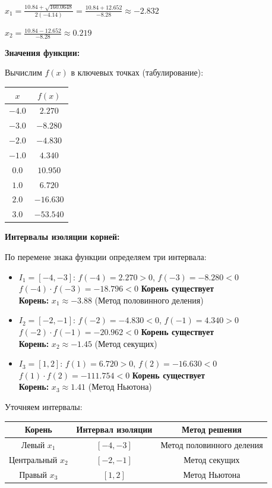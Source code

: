 \documentclass[a4paper,12pt]{article}
\begin{document}
$x_1 = \frac{10.84 + \sqrt{160.0648}}{2(-4.14)} = \frac{10.84 + 12.652}{-8.28} \approx -2.832$

$x_2 = \frac{10.84 - 12.652}{-8.28} \approx 0.219$

\textbf{Значения функции:}

Вычислим $f(x)$ в ключевых точках (табулирование):

\begin{center}
\begin{tabular}{|c|c|}
\hline
$x$ & $f(x)$ \\
\hline
$-4.0$ & $2.270$ \\
$-3.0$ & $-8.280$ \\
$-2.0$ & $-4.830$ \\
$-1.0$ & $4.340$ \\
$0.0$ & $10.950$ \\
$1.0$ & $6.720$ \\
$2.0$ & $-16.630$ \\
$3.0$ & $-53.540$ \\
\hline
\end{tabular}
\end{center}

\textbf{Интервалы изоляции корней:}

По перемене знака функции определяем три интервала:
\begin{itemize}
    \item $I_1 = [-4, -3]$: $f(-4) = 2.270 > 0$, $f(-3) = -8.280 < 0$ \\
    $f(-4) \cdot f(-3) = -18.796 < 0$ \quad \textbf{Корень существует} \\
    \textbf{Корень: } $x_1 \approx -3.88$ (Метод половинного деления)
    
    \item $I_2 = [-2, -1]$: $f(-2) = -4.830 < 0$, $f(-1) = 4.340 > 0$ \\
    $f(-2) \cdot f(-1) = -20.962 < 0$ \quad \textbf{Корень существует} \\
    \textbf{Корень: } $x_2 \approx -1.45$ (Метод секущих)
    
    \item $I_3 = [1, 2]$: $f(1) = 6.720 > 0$, $f(2) = -16.630 < 0$ \\
    $f(1) \cdot f(2) = -111.754 < 0$ \quad \textbf{Корень существует} \\
    \textbf{Корень: } $x_3 \approx 1.41$ (Метод Ньютона)
\end{itemize}

Уточняем интервалы:
\begin{center}
\begin{tabular}{|c|c|c|}
\hline
\textbf{Корень} & \textbf{Интервал изоляции} & \textbf{Метод решения} \\
\hline
Левый $x_1$ & $[-4, -3]$ & Метод половинного деления \\
Центральный $x_2$ & $[-2, -1]$ & Метод секущих \\
Правый $x_3$ & $[1, 2]$ & Метод Ньютона \\
\hline
\end{tabular}
\end{center}
\end{document}
